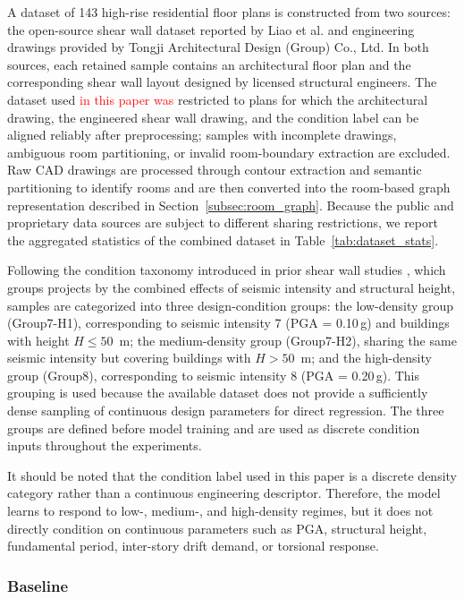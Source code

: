 A dataset of 143 high-rise residential floor plans is constructed from two sources: the open-source shear wall dataset reported by Liao et al. \cite{liaoAutomatedStructuralDesign2021a} and engineering drawings provided by Tongji Architectural Design (Group) Co., Ltd. In both sources, each retained sample contains an architectural floor plan and the corresponding shear wall layout designed by licensed structural engineers. The dataset used \textcolor{red}{in this paper was} restricted to plans for which the architectural drawing, the engineered shear wall drawing, and the condition label can be aligned reliably after preprocessing; samples with incomplete drawings, ambiguous room partitioning, or invalid room-boundary extraction are excluded. Raw CAD drawings are processed through contour extraction and semantic partitioning to identify rooms and are then converted into the room-based graph representation described in Section~\ref{subsec:room_graph}. Because the public and proprietary data sources are subject to different sharing restrictions, we report the aggregated statistics of the combined dataset in Table~\ref{tab:dataset_stats}.

Following the condition taxonomy introduced in prior shear wall studies \cite{zhaoIntelligentDesignShear2023b}, which groups projects by the combined effects of seismic intensity and structural height, samples are categorized into three design-condition groups: the low-density group (Group7-H1), corresponding to seismic intensity 7 (PGA = 0.10\,g) and buildings with height $H \le 50$~m; the medium-density group (Group7-H2), sharing the same seismic intensity but covering buildings with $H > 50$~m; and the high-density group (Group8), corresponding to seismic intensity 8 (PGA = 0.20\,g). This grouping is used because the available dataset does not provide a sufficiently dense sampling of continuous design parameters for direct regression. The three groups are defined before model training and are used as discrete condition inputs throughout the experiments.

It should be noted that the condition label used in this paper is a discrete density category rather than a continuous engineering descriptor. Therefore, the model learns to respond to low-, medium-, and high-density regimes, but it does not directly condition on continuous parameters such as PGA, structural height, fundamental period, inter-story drift demand, or torsional response.



\subsubsection{Baseline}
\label{subsubsec:baselines}


